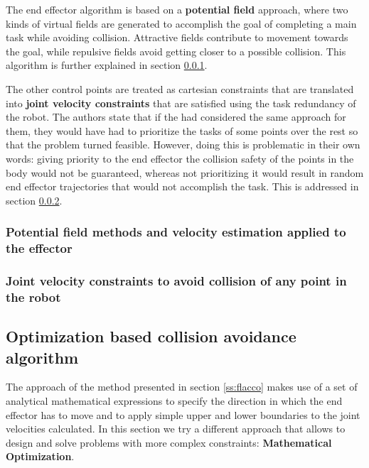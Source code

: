 The end effector algorithm is based on a \textbf{potential field} approach, where two kinds of virtual fields are generated to accomplish the goal of completing a main task while avoiding collision. Attractive fields contribute to movement towards the goal, while repulsive fields avoid getting closer to a possible collision. This algorithm is further explained in section  \ref{sss:flaccorepulsive}.

The other control points are treated as cartesian constraints that are translated into \textbf{joint velocity constraints} that are satisfied using the task redundancy of the robot. The authors state that if the had considered the same approach for them, they would have had to prioritize the tasks of some points over the rest so that the problem turned feasible. However, doing this is problematic in their own words: giving priority to the end effector the collision safety of the points in the body would not be guaranteed, whereas not prioritizing it would result in random end effector trajectories that would not accomplish the task. This is addressed in section \ref{sss:flaccobody}.

\subsubsection{Potential field methods and velocity estimation applied to the effector}
\label{sss:flaccorepulsive}

\blindtext

\subsubsection{Joint velocity constraints to avoid collision of any point in the robot}
\label{sss:flaccobody}

\blindtext

\subsection{Optimization based collision avoidance algorithm}
\label{ss:optimization}

The approach of the method presented in section \ref{ss:flacco} makes use of a set of analytical mathematical expressions to specify the direction in which the end effector has to move and to apply simple upper and lower boundaries to the joint velocities calculated. In this section we try a different approach that allows to design and solve problems with more complex constraints: \textbf{Mathematical Optimization}.

